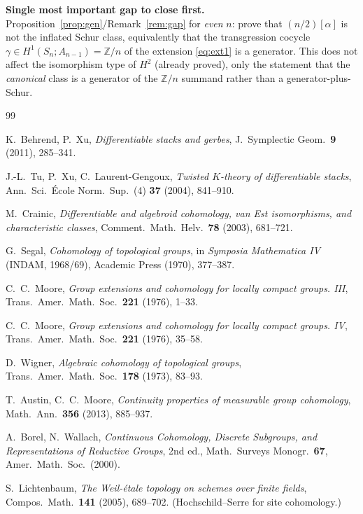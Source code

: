 \documentclass[11pt]{article}
\theoremstyle{definition}
\newcommand{\Z}{\mathbb{Z}}
\begin{document}
\medskip
\noindent\textbf{Single most important gap to close first.}
Proposition~\ref{prop:gen}/Remark~\ref{rem:gap} for \emph{even} $n$: prove that
$(n/2)[\alpha]$ is not the inflated Schur class, equivalently that the transgression cocycle
$\gamma\in H^1(S_n;A_{n-1})=\Z/n$ of the extension \eqref{eq:ext1} is a generator. This does
not affect the isomorphism type of $H^2$ (already proved), only the statement that the
\emph{canonical} class is a generator of the $\Z/n$ summand rather than a generator-plus-Schur.

\begin{thebibliography}{99}

 K.~Behrend, P.~Xu, \emph{Differentiable stacks and gerbes},
J.~Symplectic Geom.\ \textbf{9} (2011), 285--341.

 J.-L.~Tu, P.~Xu, C.~Laurent-Gengoux, \emph{Twisted $K$-theory of
differentiable stacks}, Ann.\ Sci.\ \'Ecole Norm.\ Sup.\ (4) \textbf{37} (2004), 841--910.

 M.~Crainic, \emph{Differentiable and algebroid cohomology, van Est
isomorphisms, and characteristic classes}, Comment.\ Math.\ Helv.\ \textbf{78} (2003),
681--721.

 G.~Segal, \emph{Cohomology of topological groups}, in \emph{Symposia
Mathematica IV} (INDAM, 1968/69), Academic Press (1970), 377--387.

 C.~C.~Moore, \emph{Group extensions and cohomology for locally compact
groups. III}, Trans.\ Amer.\ Math.\ Soc.\ \textbf{221} (1976), 1--33.

 C.~C.~Moore, \emph{Group extensions and cohomology for locally compact
groups. IV}, Trans.\ Amer.\ Math.\ Soc.\ \textbf{221} (1976), 35--58.

 D.~Wigner, \emph{Algebraic cohomology of topological groups}, Trans.\
Amer.\ Math.\ Soc.\ \textbf{178} (1973), 83--93.

 T.~Austin, C.~C.~Moore, \emph{Continuity properties of measurable
group cohomology}, Math.\ Ann.\ \textbf{356} (2013), 885--937.

 A.~Borel, N.~Wallach, \emph{Continuous Cohomology, Discrete
Subgroups, and Representations of Reductive Groups}, 2nd ed., Math.\ Surveys Monogr.\
\textbf{67}, Amer.\ Math.\ Soc.\ (2000).

 S.~Lichtenbaum, \emph{The Weil-\'etale topology on schemes over finite
fields}, Compos.\ Math.\ \textbf{141} (2005), 689--702. (Hochschild--Serre for site
cohomology.)


\end{thebibliography}
\end{document}

